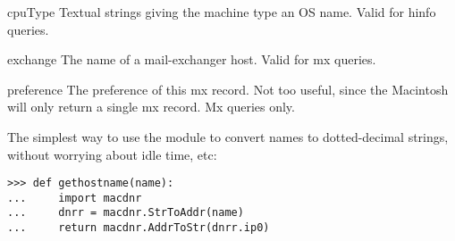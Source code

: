 \begin{datadesc}{cpuType}
Textual strings giving the machine type an OS name.  Valid for hinfo
queries.
\end{datadesc}

\begin{datadesc}{exchange}
The name of a mail-exchanger host.  Valid for mx queries.
\end{datadesc}

\begin{datadesc}{preference}
The preference of this mx record.  Not too useful, since the Macintosh
will only return a single mx record.  Mx queries only.
\end{datadesc}

The simplest way to use the module to convert names to dotted-decimal
strings, without worrying about idle time, etc:
\bcode\begin{verbatim}
>>> def gethostname(name):
...     import macdnr
...     dnrr = macdnr.StrToAddr(name)
...     return macdnr.AddrToStr(dnrr.ip0)
\end{verbatim}\ecode
